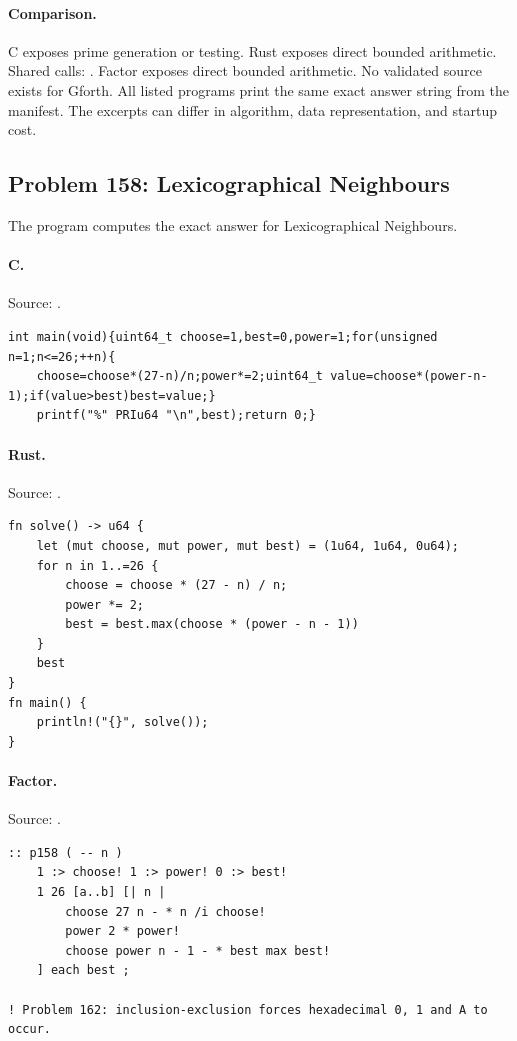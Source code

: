 \paragraph{Comparison.}
C exposes prime generation or testing. Rust exposes direct bounded arithmetic. Shared calls: \texttt{}. Factor exposes direct bounded arithmetic.
No validated source exists for Gforth.
All listed programs print the same exact answer string from the manifest. The excerpts can differ in algorithm, data representation, and startup cost.

\subsection{Problem 158: Lexicographical Neighbours}
\label{walkthrough:p158}
The program computes the exact answer for Lexicographical Neighbours.

\paragraph{C.} Source: .
\begin{lstlisting}
int main(void){uint64_t choose=1,best=0,power=1;for(unsigned n=1;n<=26;++n){
    choose=choose*(27-n)/n;power*=2;uint64_t value=choose*(power-n-1);if(value>best)best=value;}
    printf("%" PRIu64 "\n",best);return 0;}
\end{lstlisting}

\paragraph{Rust.} Source: .
\begin{lstlisting}
fn solve() -> u64 {
    let (mut choose, mut power, mut best) = (1u64, 1u64, 0u64);
    for n in 1..=26 {
        choose = choose * (27 - n) / n;
        power *= 2;
        best = best.max(choose * (power - n - 1))
    }
    best
}
fn main() {
    println!("{}", solve());
}
\end{lstlisting}

\paragraph{Factor.} Source: .
\begin{lstlisting}
:: p158 ( -- n )
    1 :> choose! 1 :> power! 0 :> best!
    1 26 [a..b] [| n |
        choose 27 n - * n /i choose!
        power 2 * power!
        choose power n - 1 - * best max best!
    ] each best ;

! Problem 162: inclusion-exclusion forces hexadecimal 0, 1 and A to occur.
\end{lstlisting}

